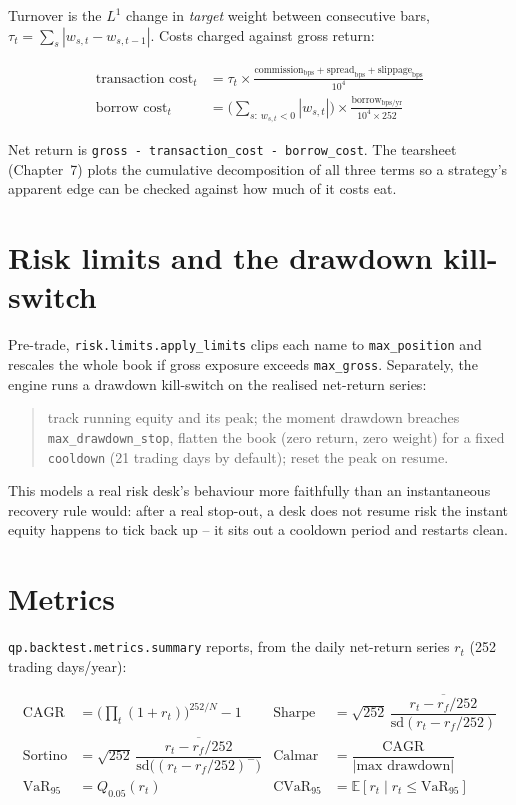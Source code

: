 Turnover is the $L^1$ change in \emph{target} weight between consecutive bars,
$\tau_t = \sum_s |w_{s,t} - w_{s,t-1}|$. Costs charged against gross return:

\begin{align}
  \text{transaction cost}_t &= \tau_t \times \frac{\text{commission}_{\text{bps}} + \text{spread}_{\text{bps}} + \text{slippage}_{\text{bps}}}{10^4} \\
  \text{borrow cost}_t &= \Big(\sum_{s:\, w_{s,t}<0} |w_{s,t}|\Big) \times \frac{\text{borrow}_{\text{bps/yr}}}{10^4 \times 252}
\end{align}

Net return is \texttt{gross - transaction\_cost - borrow\_cost}. The tearsheet
(Chapter~7) plots the cumulative decomposition of all three terms so a
strategy's apparent edge can be checked against how much of it costs eat.

\section{Risk limits and the drawdown kill-switch}

Pre-trade, \texttt{risk.limits.apply\_limits} clips each name to
\texttt{max\_position} and rescales the whole book if gross exposure exceeds
\texttt{max\_gross}. Separately, the engine runs a drawdown kill-switch on the
realised net-return series:

\begin{quote}
\small\ttfamily
track running equity and its peak; the moment drawdown breaches
\texttt{max\_drawdown\_stop}, flatten the book (zero return, zero weight) for a
fixed \texttt{cooldown} (21 trading days by default); reset the peak on resume.
\end{quote}

This models a real risk desk's behaviour more faithfully than an instantaneous
recovery rule would: after a real stop-out, a desk does not resume risk the
instant equity happens to tick back up -- it sits out a cooldown period and
restarts clean.

\section{Metrics}

\texttt{qp.backtest.metrics.summary} reports, from the daily net-return series
$r_t$ (252 trading days/year):

\begin{align*}
  \text{CAGR} &= \Big(\textstyle\prod_t (1+r_t)\Big)^{252/N} - 1
  &\text{Sharpe} &= \sqrt{252}\,\dfrac{\overline{r_t - r_f/252}}{\mathrm{sd}(r_t - r_f/252)} \\
  \text{Sortino} &= \sqrt{252}\,\dfrac{\overline{r_t - r_f/252}}{\mathrm{sd}\big((r_t-r_f/252)^-\big)}
  &\text{Calmar} &= \dfrac{\text{CAGR}}{|\text{max drawdown}|} \\
  \text{VaR}_{95} &= Q_{0.05}(r_t)
  &\text{CVaR}_{95} &= \mathbb E[r_t \mid r_t \le \text{VaR}_{95}]
\end{align*}

